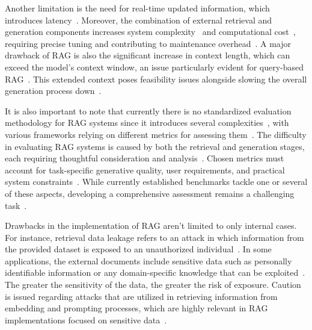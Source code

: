 \documentclass{DESSThesis}
\begin{document}
Another limitation is the need for real-time updated information, which introduces latency~\cite{10.1145/3701716.3715490,zhao2024retrievalaugmentedgenerationaigeneratedcontent,gao2024retrievalaugmentedgenerationlargelanguage}. Moreover, the combination of external retrieval and generation components increases system complexity~\cite{zhao2024retrievalaugmentedgenerationaigeneratedcontent} and computational cost~\cite{10921633,gao2024retrievalaugmentedgenerationlargelanguage}, requiring precise tuning and contributing to maintenance overhead~\cite{10.1145/3701716.3715490,zhao2024retrievalaugmentedgenerationaigeneratedcontent}. A major drawback of RAG is also the significant increase in context length, which can exceed the model's context window, an issue particularly evident for query-based RAG~\cite{zhao2024retrievalaugmentedgenerationaigeneratedcontent}. This extended context poses feasibility issues alongside slowing the overall generation process down~\cite{zhao2024retrievalaugmentedgenerationaigeneratedcontent}.

It is also important to note that currently there is no standardized evaluation methodology for RAG systems since it introduces several complexities~\cite{Yu_2025}, with various frameworks relying on different metrics for assessing them~\cite{10921633}. The difficulty in evaluating RAG systems is caused by both the retrieval and generation stages, each requiring thoughtful consideration and analysis~\cite{Yu_2025}. Chosen metrics must account for task-specific generative quality, user requirements, and practical system constraints~\cite{Yu_2025}. While currently established benchmarks tackle one or several of these aspects, developing a comprehensive assessment remains a challenging task~\cite{Yu_2025}.

Drawbacks in the implementation of RAG aren't limited to only internal cases. For instance, retrieval data leakage refers to an attack in which information from the provided dataset is exposed to an unauthorized individual~\cite{ammann2024analysis}. In some applications, the external documents include sensitive data such as personally identifiable information or any domain-specific knowledge that can be exploited~\cite{ammann2024analysis}. The greater the sensitivity of the data, the greater the risk of exposure. Caution is issued regarding attacks that are utilized in retrieving information from embedding and prompting processes, which are highly relevant in RAG implementations focused on sensitive data~\cite{ammann2024analysis}.
\end{document}
